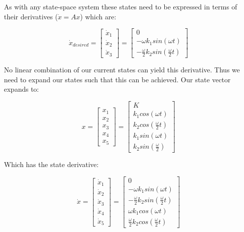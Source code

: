 As with any state-space system these states need to be expressed in terms of their derivatives ($\dot x = Ax$) which are:

\begin{equation} \label{eq:consump_x_deriv_s}
	\dot x_{desired}  = \begin{bmatrix}
		\dot x_1 \\
		\dot x_2 \\
		\dot x_3
	\end{bmatrix}
	=
	\begin{bmatrix}
		0 \\
		- \omega k_1 sin(\omega t) \\
		- \frac{\omega}{2} k_2 sin(\frac{\omega}{2} t)
	\end{bmatrix}
\end{equation}

No linear combination of our current states can yield this derivative. Thus we need to expand our states such that this can be achieved. Our state vector expands to:

\begin{equation} \label{eq:consump_x_l}
		x =  \begin{bmatrix}
			x_1 \\
			x_2 \\
			x_3 \\
			x_4 \\
			x_5
		\end{bmatrix}
		=
		 \begin{bmatrix}
		K \\
		k_1 cos(\omega t) \\
		k_2 cos(\frac{\omega}{2} t) \\
		k_1 sin(\omega t) \\
		k_2 sin(\frac{\omega}{2}) 
	\end{bmatrix}
\end{equation}

Which has the state derivative:

\begin{equation} \label{eq:consump_x_deriv_l}
	\dot x =  \begin{bmatrix}
		\dot x_1 \\
		\dot x_2 \\
		\dot x_3 \\
		\dot x_4 \\
		\dot x_5
	\end{bmatrix}
	=
	\begin{bmatrix}
		0 \\
		- \omega k_1 sin(\omega t) \\
		- \frac{\omega}{2} k_2 sin(\frac{\omega}{2} t) \\
		\omega k_1 cos (\omega t) \\
		\frac{\omega}{2} k_2 cos (\frac{\omega}{2} t)
	\end{bmatrix}
\end{equation}


